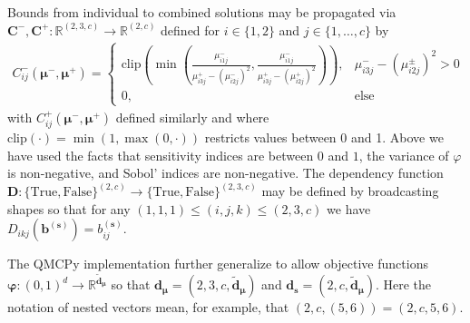 \documentclass[graybox]{svmult}
\begin{document}
Bounds from individual to combined solutions may be propagated via $\boldsymbol{C}^-,\boldsymbol{C}^+:\mathbb{R}^{(2, 3, c)} \to \mathbb{R}^{(2, c)}$ defined for $i \in \{1,2\}$ and $j \in \{1,\dots,c\}$  by  
\begin{align*}
    C_{ij}^-(\boldsymbol{\mu}^-,\boldsymbol{\mu}^+) 
    = \begin{cases} 
        \text{clip}\left(\min\left(\frac{\mu_{i1j}^-}{\mu_{i3j}^+-\left(\mu_{i2j}^-\right)^2},\frac{\mu_{i1j}^-}{\mu_{i3j}^+-\left(\mu_{i2j}^+\right)^2}\right)\right), & \mu_{i3j}^- - \left(\mu_{i2j}^\pm\right)^2 >0 \\
        0, &\text{else}
     \end{cases} %
\end{align*}
with $C^+_{ij}(\boldsymbol{\mu}^-,\boldsymbol{\mu}^+)$ defined similarly and where $\text{clip}(\cdot) = \min(1,\max(0,\cdot))$ restricts values between 0 and 1. Above we have used the facts that sensitivity indices are between $0$ and $1$, the variance of $\varphi$ is non-negative, and Sobol' indices are non-negative. The dependency function $\boldsymbol{D}:\{\text{True},\text{False}\}^{(2, c)} \to \{\text{True},\text{False}\}^{(2, 3, c)}$ may be defined by broadcasting shapes so that for any $(1,1,1) \leq (i,j,k) \leq (2,3,c)$ we have $D_{ikj}(\boldsymbol{b}^{(\boldsymbol{s})}) = b_{ij}^{(\boldsymbol{s})}$. 

The QMCPy implementation further generalize to allow objective functions $\boldsymbol{\varphi}: (0,1)^{d} \to \mathbb{R}^{\tilde{\boldsymbol{d}}_{\boldsymbol{\mu}}}$ so that $\boldsymbol{d}_{\boldsymbol{\mu}} = (2,3,c,\tilde{\boldsymbol{d}}_{\boldsymbol{\mu}})$ and $\boldsymbol{d}_{\boldsymbol{s}} = (2,c,\tilde{\boldsymbol{d}}_{\boldsymbol{\mu}})$. Here the notation of nested vectors mean, for example, that  $(2,c,(5,6)) =(2,c,5,6)$.
\end{document}
